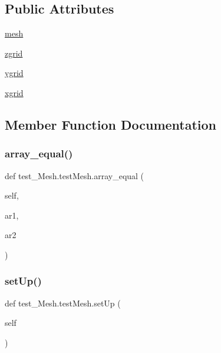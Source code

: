 \subsection*{Public Attributes}
\begin{DoxyCompactItemize}
\item 
\hyperlink{classtest__Mesh_1_1testMesh_ae75a535cdc2c879cfc37ad2ee5387ec8}{mesh}
\item 
\hyperlink{classtest__Mesh_1_1testMesh_a391947bebb46aa6d283ee11c04d4029d}{zgrid}
\item 
\hyperlink{classtest__Mesh_1_1testMesh_aef5fc98f77ac2e96a8835e6e5942e7d5}{ygrid}
\item 
\hyperlink{classtest__Mesh_1_1testMesh_a1adc2256095d362f35c76e1f35206356}{xgrid}
\end{DoxyCompactItemize}


\subsection{Member Function Documentation}
\mbox{\label{classtest__Mesh_1_1testMesh_af34f2fc5816343d4bfa4fffae6dc5f5d}} 
\subsubsection{\texorpdfstring{array\+\_\+equal()}{array\_equal()}}
{\footnotesize\ttfamily def test\+\_\+\+Mesh.\+test\+Mesh.\+array\+\_\+equal (\begin{DoxyParamCaption}\item[{}]{self,  }\item[{}]{ar1,  }\item[{}]{ar2 }\end{DoxyParamCaption})}

\mbox{\label{classtest__Mesh_1_1testMesh_adfef7cb54161c643913e7ef04f5a6a8c}} 
\subsubsection{\texorpdfstring{set\+Up()}{setUp()}}
{\footnotesize\ttfamily def test\+\_\+\+Mesh.\+test\+Mesh.\+set\+Up (\begin{DoxyParamCaption}\item[{}]{self }\end{DoxyParamCaption})}


